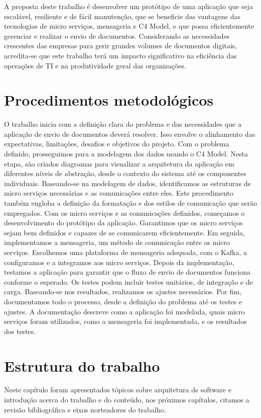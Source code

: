 A proposta deste trabalho é desenvolver um protótipo de uma aplicação que seja escalável,
resiliente e de fácil manutenção, que se beneficie das vantagens das tecnologias de micro
serviços, mensageria e C4 Model, e que possa eficientemente gerenciar e realizar o envio de
documentos. Considerando as necessidades crescentes das empresas para gerir grandes volumes
de documentos digitais, acredita-se que este trabalho terá um impacto significativo na eficiência
das operações de TI e na produtividade geral das organizações.

\section{Procedimentos metodológicos}
O trabalho inicia com a definição clara do problema e das necessidades que a aplicação
de envio de documentos deverá resolver. Isso envolve o alinhamento das expectativas, limitações,
desafios e objetivos do projeto.
Com o problema definido, prosseguimos para a modelagem dos dados usando o C4 Model.
Nesta etapa, são criados diagramas para visualizar a arquitetura da aplicação em diferentes níveis
de abstração, desde o contexto do sistema até os componentes individuais.
Baseando-se na modelagem de dados, identificamos as estruturas de micro serviços
necessárias e as comunicações entre eles. Este procedimento também engloba a definição da
formatação e dos estilos de comunicação que serão empregados.
Com os micro serviços e as comunicações definidos, começamos o desenvolvimento do
protótipo da aplicação. Garantimos que os micro serviços sejam bem definidos e capazes de se
comunicarem eficientemente.
Em seguida, implementamos a mensageria, um método de comunicação entre os micro
serviços. Escolhemos uma plataforma de mensageria adequada, com o Kafka, a configuramos e
a integramos aos micro serviços.
Depois da implementação, testamos a aplicação para garantir que o fluxo de envio de
documentos funciona conforme o esperado. Os testes podem incluir testes unitários, de integração
e de carga. Baseando-se nos resultados, realizamos os ajustes necessários.
Por fim, documentamos todo o processo, desde a definição do problema até os testes e
ajustes. A documentação descreve como a aplicação foi modelada, quais micro serviços foram
utilizados, como a mensageria foi implementada, e os resultados dos testes.


\section{Estrutura do trabalho}
Neste capítulo foram apresentados tópicos sobre arquitetura de software e introdução
acerca do trabalho e do conteúdo, nos próximos capítulos, citamos a revisão bibliográfica e eixos
norteadores do trabalho.